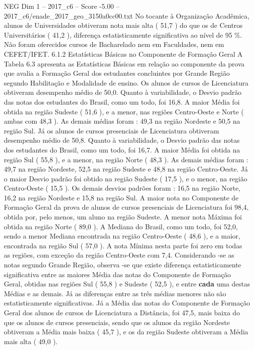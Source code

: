\begin{textsample}{NEG Dim 1 – 2017\_c6 – Score -5.00 – 2017\_c6/enade\_2017\_geo\_3150a0cc00.txt}
No tocante à Organização Acadêmica, alunos de Universidades obtiveram nota mais alta ( 51,7 ) do que os de Centros Universitários ( 41,2 ), diferença estatisticamente significativa ao nível de 95 \%.
Não foram oferecidos cursos de Bacharelado nem em Faculdades, nem em CEFET/IFET. 6.1.2 Estatísticas Básicas no Componente de Formação Geral A Tabela 6.3 apresenta as Estatísticas Básicas em relação ao componente da prova que avalia a Formação Geral dos estudantes concluintes por Grande Região segundo Habilitação e Modalidade de ensino.
Os alunos de cursos de Licenciatura obtiveram desempenho médio de 50,0.
Quanto à variabilidade, o Desvio padrão das notas dos estudantes do Brasil, como um todo, foi 16,8.
A maior Média foi obtida na região Sudeste ( 51,6 ), e a menor, nas regiões Centro-Oeste e Norte ( ambas com 48,3 ).
As demais médias foram : 49,3 na região Nordeste e 50,5 na região Sul.
Já os alunos de cursos presenciais de Licenciatura obtiveram desempenho médio de 50,8.
Quanto à variabilidade, o Desvio padrão das notas dos estudantes do Brasil, como um todo, foi 16,7.
A maior Média foi obtida na região Sul ( 55,8 ), e a menor, na região Norte ( 48,3 ).
As demais médias foram : 49,7 na região Nordeste, 52,5 na região Sudeste e 48,8 na região Centro-Oeste.
Já o maior Desvio padrão foi obtido na região Sudeste ( 17,5 ), e o menor, na região Centro-Oeste ( 15,5 ).
Os demais desvios padrões foram : 16,5 na região Norte, 16,2 na região Nordeste e 15,8 na região Sul.
A maior nota no Componente de Formação Geral da prova de alunos de cursos presenciais de Licenciatura foi 98,4, obtida por, pelo menos, um aluno na região Sudeste.
A menor nota Máxima foi obtida na região Norte ( 89,0 ).
A Mediana do Brasil, como um todo, foi 52,0, sendo a menor Mediana encontrada na região Centro-Oeste ( 48,6 ), e a maior, encontrada na região Sul ( 57,0 ).
A nota Mínima nesta parte foi zero em todas as regiões, com exceção da região Centro-Oeste com 7,4.
Considerando -se as notas segundo Grande Região, observa -se que existe diferença estatisticamente significativa entre as maiores Média das notas do Componente de Formação Geral, obtidas nas regiões Sul ( 55,8 ) e Sudeste ( 52,5 ), e entre \textbf{cada} uma destas Médias e as demais.
Já as diferenças entre as três médias menores não são estatisticamente significativas.
Já a Média das notas do Componente de Formação Geral dos alunos de cursos de Licenciatura a Distância, foi 47,5, mais baixa do que os alunos de cursos presenciais, sendo que os alunos da região Nordeste obtiveram a Média mais baixa ( 45,7 ), e os da região Sudeste obtiveram a Média mais alta ( 49,0 ).

\end{textsample}
